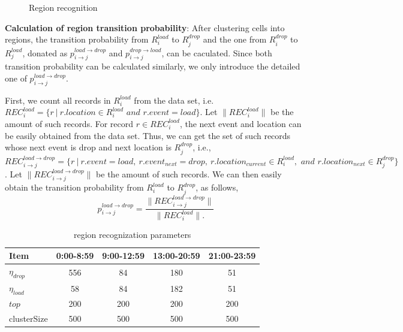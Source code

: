 \begin{figure}[!t]
\centering
{}
\centering
\caption{Region recognition}\label{figure_region_recognizition}
\end{figure}

\textbf{Calculation of region transition probability}: After clustering cells into regions, the transition probability from $R_i^{load}$ to $R_j^{drop}$ and the one from $R_i^{drop}$ to $R_j^{load}$, donated as $p_{i\rightarrow j}^{load\rightarrow drop}$ and $p_{i\rightarrow j}^{drop\rightarrow load}$, can be caculated. Since both transition probability can be calculated similarly, we only introduce the detailed one of $p_{i\rightarrow j}^{load\rightarrow drop}$.

First, we count all records in $R_i^{load}$ from the data set,  i.e. $REC_i^{load}=\{r~|~r.location\in{R_i^{load} \textit{ and }  r.event=load}\}$. Let $\|REC_i^{load}\|$ be the amount of such records. For record $r \in REC_i^{load}$, the next event and location can be easily obtained from the data set. Thus, we can get the set of such records whose next event is drop and next location is $R_j^{drop}$, i.e., $REC_{i\to j}^{load\to drop}=\{r~|~r.event=load,~r.event_{next}=drop,~r.location_{current}\in R_i^{load}, \textit{ and }  r.location_{next}\in R_j^{drop}\}$. Let $\|REC_{i\to j}^{load\to drop}\|$ be the amount of such records. We can then easily obtain the transition probability from $R_i^{load}$ to $R_j^{drop}$, as follows,
\[p_{i \to j}^{load \to drop} = \frac{\|REC_{i\to j}^{load\to drop}\|}{\|REC_i^{load}\|.}\]


\begin{table}
\caption{region recognization parameters}
\centering
\begin{tabular}{l|c|c|c|c}
  \hline
  Item & 0:00-8:59 &9:00-12:59&13:00-20:59 &21:00-23:59 \\
  \hline
  $\eta_{drop}$ & 556&84 &180 &51\\
  $\eta_{load}$ & 58&84 &182 &51\\
  $top$ & 200&200 &200 &200\\
  clusterSize& 500&500 &500 &500\\
  \hline
\end{tabular}
\end{table}